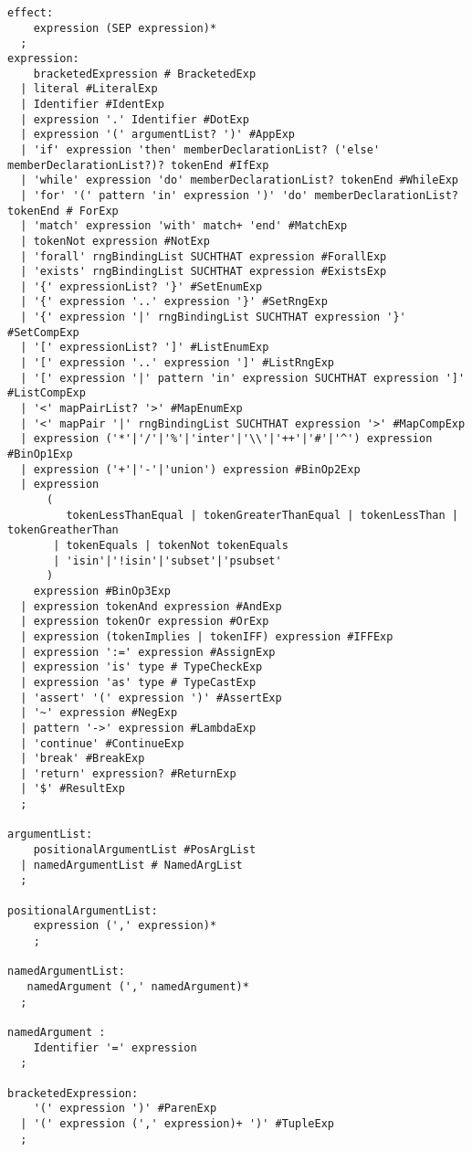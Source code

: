 \begin{verbatim}
effect:
    expression (SEP expression)*
  ;
expression: 
    bracketedExpression # BracketedExp
  | literal #LiteralExp
  | Identifier #IdentExp
  | expression '.' Identifier #DotExp
  | expression '(' argumentList? ')' #AppExp
  | 'if' expression 'then' memberDeclarationList? ('else' memberDeclarationList?)? tokenEnd #IfExp
  | 'while' expression 'do' memberDeclarationList? tokenEnd #WhileExp
  | 'for' '(' pattern 'in' expression ')' 'do' memberDeclarationList? tokenEnd # ForExp 
  | 'match' expression 'with' match+ 'end' #MatchExp
  | tokenNot expression #NotExp
  | 'forall' rngBindingList SUCHTHAT expression #ForallExp 
  | 'exists' rngBindingList SUCHTHAT expression #ExistsExp 
  | '{' expressionList? '}' #SetEnumExp
  | '{' expression '..' expression '}' #SetRngExp
  | '{' expression '|' rngBindingList SUCHTHAT expression '}' #SetCompExp 
  | '[' expressionList? ']' #ListEnumExp
  | '[' expression '..' expression ']' #ListRngExp
  | '[' expression '|' pattern 'in' expression SUCHTHAT expression ']' #ListCompExp 
  | '<' mapPairList? '>' #MapEnumExp
  | '<' mapPair '|' rngBindingList SUCHTHAT expression '>' #MapCompExp 
  | expression ('*'|'/'|'%'|'inter'|'\\'|'++'|'#'|'^') expression #BinOp1Exp
  | expression ('+'|'-'|'union') expression #BinOp2Exp
  | expression 
      (
         tokenLessThanEqual | tokenGreaterThanEqual | tokenLessThan | tokenGreatherThan 
       | tokenEquals | tokenNot tokenEquals
       | 'isin'|'!isin'|'subset'|'psubset' 
      )  
    expression #BinOp3Exp
  | expression tokenAnd expression #AndExp
  | expression tokenOr expression #OrExp
  | expression (tokenImplies | tokenIFF) expression #IFFExp
  | expression ':=' expression #AssignExp
  | expression 'is' type # TypeCheckExp
  | expression 'as' type # TypeCastExp
  | 'assert' '(' expression ')' #AssertExp 
  | '~' expression #NegExp
  | pattern '->' expression #LambdaExp
  | 'continue' #ContinueExp
  | 'break' #BreakExp
  | 'return' expression? #ReturnExp
  | '$' #ResultExp
  ;

argumentList: 
    positionalArgumentList #PosArgList
  | namedArgumentList # NamedArgList
  ;

positionalArgumentList:
    expression (',' expression)* 
    ;

namedArgumentList:
   namedArgument (',' namedArgument)* 
  ;

namedArgument :
    Identifier '=' expression
  ;

bracketedExpression:
    '(' expression ')' #ParenExp
  | '(' expression (',' expression)+ ')' #TupleExp
  ;


\end{verbatim}
